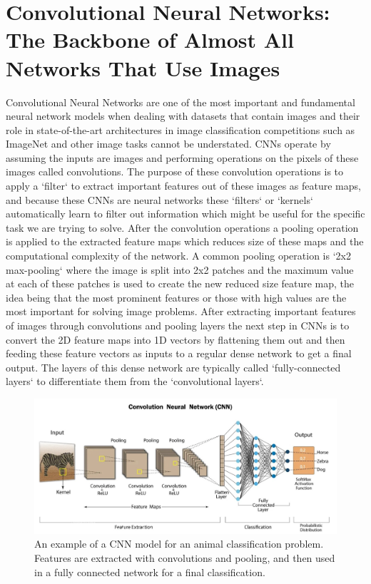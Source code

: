 \section{Convolutional Neural Networks: The Backbone of Almost All Networks That Use Images}
Convolutional Neural Networks \cite{CNN1} are one of the most important and fundamental neural network models when dealing with datasets that contain images and their role in state-of-the-art architectures in image classification competitions such as ImageNet and other image tasks cannot be understated. CNNs operate by assuming the inputs are images and performing operations on the pixels of these images called convolutions. The purpose of these convolution operations is to apply a `filter` to extract important features out of these images as feature maps, and because these CNNs are neural networks these `filters` or `kernels` automatically learn to filter out information which might be useful for the specific task we are trying to solve. After the convolution operations a pooling operation is applied to the extracted feature maps which reduces size of these maps and the computational complexity of the network. A common pooling operation is `2x2 max-pooling` where the image is split into 2x2 patches and the maximum value at each of these patches is used to create the new reduced size feature map, the idea being that the most prominent features or those with high values are the most important for solving image problems. After extracting important features of images through convolutions and pooling layers the next step in CNNs is to convert the 2D feature maps into 1D vectors by flattening them out and then feeding these feature vectors as inputs to a regular dense network to get a final output. The layers of this dense network are typically called `fully-connected layers` to differentiate them from the `convolutional layers`.

\begin{figure}[H] \centering
    \includegraphics[width=\linewidth]{figures/cnn_architecture.jpeg}
    \caption{An example of a CNN model for an animal classification problem. Features are extracted with convolutions and pooling, and then used in a fully connected network for a final classification.}
    \label{fig:cnn_architecture}
\end{figure}


